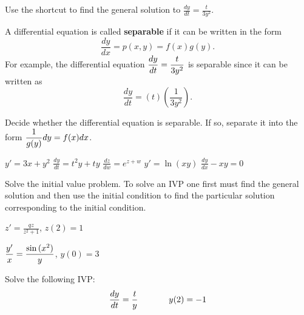 \item	Use the shortcut to find the general solution to  $\displaystyle \frac{dy}{dt}=\frac{t}{3y^2}$. \label{05problem5}
\vfill
\ee

\clearpage

A differential equation is called \textbf{separable} if it can be written in the form
\[ \frac{dy}{dx}=p(x,y)=f(x)g(y). \]
For example, the differential equation $\displaystyle \frac{dy}{dt}=\frac{t}{3y^2}$ is separable since it can be written as 
\[ \frac{dy}{dt}=(t)\left( \frac{1}{3y^2} \right).\]

\bb[resume]
\ii Decide whether the differential equation is separable.  If
so, separate it into the form $\displaystyle \frac{1}{g(y)} dy = f(x) dx$.

\bb
\ii $y' = 3x+y^2$ \vfill 
\ii $\displaystyle \frac{dy}{dt} = t^2y+ty$ \vfill
\ii $\displaystyle \frac{dz}{dw} = e^{z+w}$ \vfill
\ii $y'=\ln{(xy)}$ \vfill 
\ii $\displaystyle \frac{dy}{dx}-xy =0$ \vfill
\ee


\clearpage

\ii Solve the initial value problem. To solve an IVP one first must find the general solution and then use the initial condition to find the particular solution corresponding to the initial condition.

\bb
\ii $z' = \frac{qz}{z^2+1}$, $z(2)=1$ \vfill

\ii $\displaystyle \frac{y'}{x}= \frac{\sin{(x^2)}}{y}$, $y(0)=3$  \vfill
\ee


\clearpage

\item Solve the following IVP:    
\[ \frac{dy}{dt}=\frac{t}{y}\hspace{0.5in} y(2)=-1\]
\vfill


